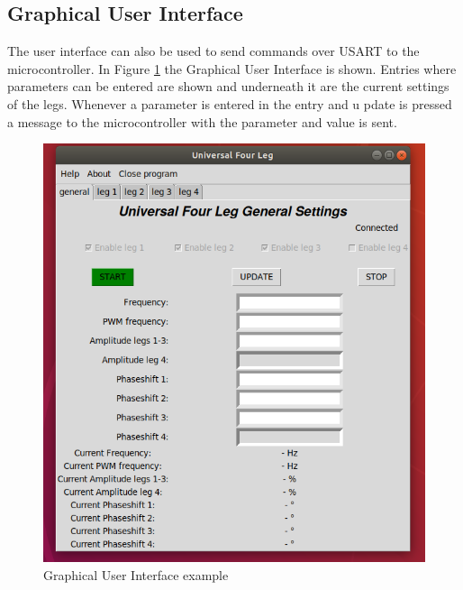 \subsection{Graphical User Interface}
The user interface can also be used to send commands over USART to the microcontroller. In Figure \ref{GUI} the Graphical User Interface is shown. Entries where parameters can be entered are shown and underneath it are the current settings of the legs. Whenever a parameter is entered in the entry and u pdate is pressed a message to the microcontroller with the parameter and value is sent.

\begin{figure}[h!]
\centering
\includegraphics[width=\linewidth]{pictures/GUI.png}
\caption{Graphical User Interface example}
\label{GUI}
\end{figure}

